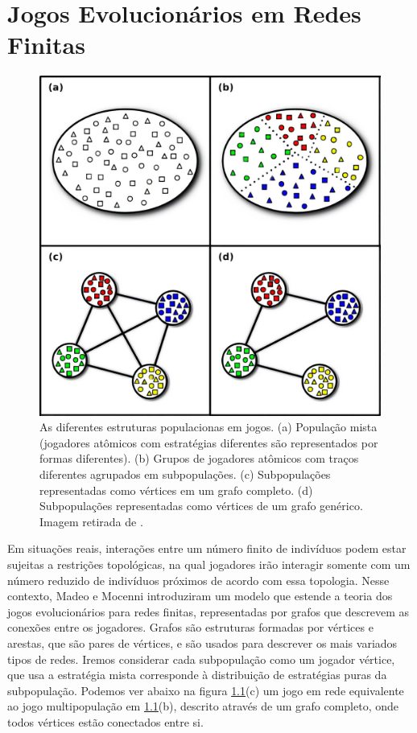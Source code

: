 \chapter{Jogos Evolucionários em Redes Finitas}

\begin{figure}[h]
    \caption{As diferentes estruturas populacionas em jogos. (a) População mista (jogadores atômicos com estratégias diferentes são representados por formas diferentes). (b) Grupos de jogadores atômicos com traços diferentes agrupados em subpopulações. (c) Subpopulações representadas como vértices em um grafo completo. (d) Subpopulações representadas como vértices de um grafo genérico. Imagem retirada de \cite{madeo2015}.}
    \centerline{\includegraphics[scale=0.22]{./img/dif_populacao.jpg}}
    \label{fig:dif_populacao}
\end{figure}

Em situações reais, interações entre um número finito de indivíduos podem estar sujeitas a restrições topológicas, na qual jogadores irão interagir somente com um número reduzido de indivíduos próximos de acordo com essa topologia. Nesse contexto, Madeo e Mocenni \cite{madeo2015} introduziram um modelo que estende a teoria dos jogos evolucionários para redes finitas, representadas por grafos que descrevem as conexões entre os jogadores. Grafos são estruturas formadas por vértices e arestas, que são pares de vértices, e são usados para descrever os mais variados tipos de redes. Iremos considerar cada subpopulação como um jogador vértice, que usa a estratégia mista corresponde à distribuição de estratégias puras da subpopulação. Podemos ver abaixo na figura \ref{fig:dif_populacao}(c) um jogo em rede equivalente ao jogo multipopulação em \ref{fig:dif_populacao}(b), descrito através de um grafo completo, onde todos vértices estão conectados entre si.

